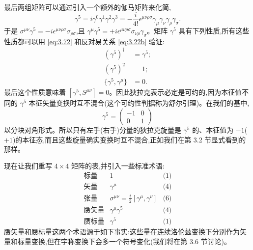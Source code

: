 最后两组矩阵可以通过引入一个额外的伽马矩阵来化简,
\begin{equation}
  \gamma^5 = i\gamma^0\gamma^1\gamma^2\gamma^3
    = -\frac{i}{4!}\epsilon^{\mu\nu\rho\sigma}
      \gamma_\mu\gamma_\nu\gamma_\rho\gamma_\sigma .
  \label{eq:3.72}
\end{equation}
于是 $\sigma^{\mu\nu}\gamma^5 = -i\epsilon^{\mu\nu\rho\sigma}\sigma_{\rho\sigma}$,且 $\gamma^\mu\gamma^5 = +i\epsilon^{\mu\nu\rho\sigma}\sigma_{\nu\rho}\gamma_\sigma$。矩阵 $\gamma^5$ 具有下列性质,所有这些性质都可以用 \eqref{eq:3.72} 和反对易关系 \eqref{eq:3.22b} 验证:
\begin{align}
  (\gamma^5)^\dagger &= \gamma^5; \label{eq:3.73}\\
  (\gamma^5)^2 &= 1; \label{eq:3.74}\\
  \{\gamma^5, \gamma^\mu\} &= 0 . \label{eq:3.75}
\end{align}
最后这个性质意味着 $[\gamma^5, S^{\mu\nu}] = 0$。因此狄拉克表示必定是可约的,因为本征值不同的 $\gamma^5$ 本征矢量变换时互不混合(这个可约性判据称为舒尔引理)。在我们的基中,
\begin{equation}
  \gamma^5 = \begin{pmatrix}-1&0\\0&1\end{pmatrix}
  \label{eq:3.76}
\end{equation}
以分块对角形式。所以只有左手(右手)分量的狄拉克旋量是 $\gamma^5$ 的、本征值为 $-1$($+1$)的本征态,而且这些旋量确实变换时互不混合,正如我们在第 3.2 节显式看到的那样。

现在让我们重写 $4\times4$ 矩阵的表,并引入一些标准术语:
\begin{equation}
  \begin{array}{lll}
    \text{标量} & 1 & \text{(1)}\\
    \text{矢量} & \gamma^\mu & \text{(4)}\\
    \text{张量} & \sigma^{\mu\nu} = \tfrac{i}{2}[\gamma^\mu,\gamma^\nu]
      & \text{(6)}\\
    \text{赝矢量} & \gamma^\mu\gamma^5 & \text{(4)}\\
    \text{赝标量} & \gamma^5 & \text{(1)}
  \end{array}
  \label{eq:3.77}
\end{equation}
赝矢量和赝标量这两个术语源于如下事实:这些量在连续洛伦兹变换下分别作为矢量和标量变换,但在宇称变换下会多一个符号变化(我们将在第 3.6 节讨论)。

